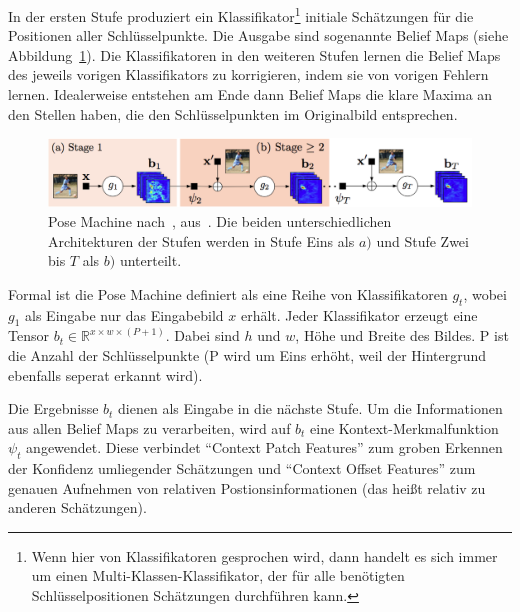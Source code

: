 \documentclass[journal, a4paper]{IEEEtran}
\begin{document}
        In der ersten Stufe produziert ein Klassifikator\footnote{Wenn hier von Klassifikatoren gesprochen wird, dann handelt es sich immer um einen Multi-Klassen-Klassifikator, der für alle benötigten Schlüsselpositionen Schätzungen durchführen kann.} initiale Schätzungen für die Positionen aller Schlüsselpunkte. Die Ausgabe sind sogenannte Belief Maps (siehe Abbildung~\ref{fig:pose_machine}). Die Klassifikatoren in den weiteren Stufen lernen die Belief Maps des jeweils vorigen Klassifikators zu korrigieren, indem sie von vorigen Fehlern lernen. Idealerweise entstehen am Ende dann Belief Maps die klare Maxima an den Stellen haben, die den Schlüsselpunkten im Originalbild entsprechen.

        \begin{figure}[!hbt]
                \begin{center}
                \includegraphics[width=1\columnwidth]{pose_machine.png}
                \caption{Pose Machine nach~\cite{ramakrishna2014pose}, aus~\cite{conv_pose}. Die beiden unterschiedlichen Architekturen der Stufen werden in Stufe Eins als $a)$ und Stufe Zwei bis $T$ als $b)$ unterteilt.}
                \label{fig:pose_machine}
                
                \end{center}
        \end{figure}

        Formal ist die Pose Machine definiert als eine Reihe von Klassifikatoren $g_t$, wobei $g_1$ als Eingabe nur das Eingabebild $x$ erhält. Jeder Klassifikator erzeugt eine Tensor $b_{t}\in\mathbb{R}^{x \times w \times (P+1)}$. Dabei sind $h$ und $w$, Höhe und Breite des Bildes. P ist die Anzahl der Schlüsselpunkte (P wird um Eins erhöht, weil der Hintergrund ebenfalls seperat erkannt wird).

        Die Ergebnisse $b_t$ dienen als Eingabe in die nächste Stufe. 
        Um die Informationen aus allen Belief Maps zu verarbeiten, wird auf $b_t$ eine Kontext-Merkmalfunktion $\psi_t$ angewendet. Diese verbindet "`Context Patch Features"' zum groben Erkennen der Konfidenz umliegender Schätzungen und "`Context Offset Features"' zum genauen Aufnehmen von relativen Postionsinformationen (das heißt relativ zu anderen Schätzungen).
\end{document}
